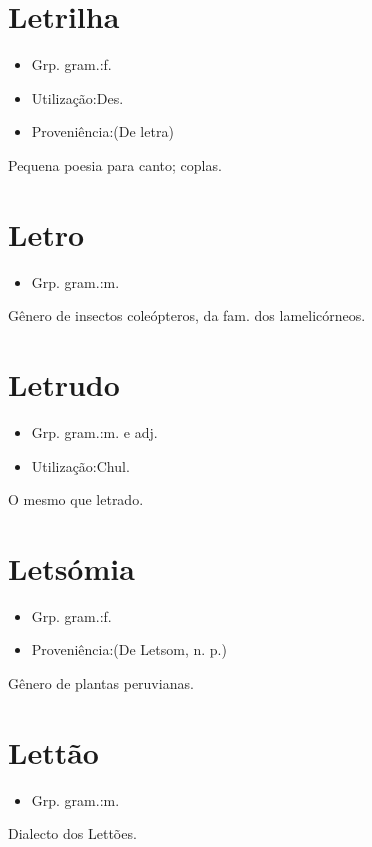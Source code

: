 \section{Letrilha}
\begin{itemize}
\item {Grp. gram.:f.}
\end{itemize}
\begin{itemize}
\item {Utilização:Des.}
\end{itemize}
\begin{itemize}
\item {Proveniência:(De \textunderscore letra\textunderscore )}
\end{itemize}
Pequena poesia para canto; coplas.
\section{Letro}
\begin{itemize}
\item {Grp. gram.:m.}
\end{itemize}
Gênero de insectos coleópteros, da fam. dos lamelicórneos.
\section{Letrudo}
\begin{itemize}
\item {Grp. gram.:m.  e  adj.}
\end{itemize}
\begin{itemize}
\item {Utilização:Chul.}
\end{itemize}
O mesmo que \textunderscore letrado\textunderscore .
\section{Letsómia}
\begin{itemize}
\item {Grp. gram.:f.}
\end{itemize}
\begin{itemize}
\item {Proveniência:(De \textunderscore Letsom\textunderscore , n. p.)}
\end{itemize}
Gênero de plantas peruvianas.
\section{Lettão}
\begin{itemize}
\item {Grp. gram.:m.}
\end{itemize}
Dialecto dos Lettões.
